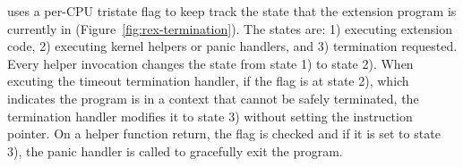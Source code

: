 \projname{} uses a per-CPU tristate flag to keep track the state that the
    extension program is currently in (Figure~\ref{fig:rex-termination}).
The states are: 1) executing extension code, 2) executing kernel helpers or
    panic handlers, and 3) termination requested.
Every helper invocation changes the state from state 1) to state 2).
When excuting the timeout termination handler, if the flag is at state 2),
    which indicates the program is in a context that cannot be safely
    terminated, the termination handler modifies it to state 3) without
    setting the instruction pointer.
On a helper function return, the flag is checked and if it is set to state 3),
    the panic handler is called to gracefully exit the program.
